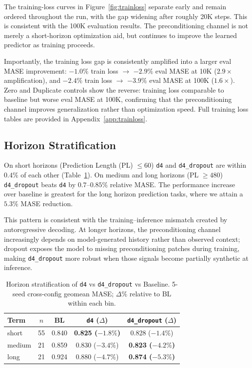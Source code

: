 \documentclass{article}
\begin{document}
The training-loss curves in Figure~\ref{fig:trainloss} separate early and remain ordered throughout the run, with the gap widening after roughly 20K steps. This is consistent with the 100K evaluation results. The preconditioning channel is not merely a short-horizon optimization aid, but continues to improve the learned predictor as training proceeds.

Importantly, the training loss gap is consistently amplified into a larger eval MASE improvement: $-1.0\%$ train loss $\to$ $-2.9\%$ eval MASE at 10K ($2.9\times$ amplification), and $-2.4\%$ train loss $\to$ $-3.9\%$ eval MASE at 100K ($1.6\times$). Zero and Duplicate controls show the reverse: training loss comparable to baseline but worse eval MASE at 100K, confirming that the preconditioning channel improves generalization rather than optimization speed. Full training loss tables are provided in Appendix~\ref{app:trainloss}.

\subsection{Horizon Stratification}

On short horizons (Prediction Length (PL) $\leq 60$) \texttt{d4} and \texttt{d4\_dropout} are within $0.4\%$ of each other (Table~\ref{tab:horizon-main}). On medium and long horizons (PL $\geq 480$) \texttt{d4\_dropout} beats \texttt{d4} by $0.7$--$0.85\%$ relative MASE. The performance increase over baseline is greatest for the long horizon prediction tasks, where we attain a $5.3\%$ MASE reduction.

This pattern is consistent with the training--inference mismatch created by autoregressive decoding. At longer horizons, the preconditioning channel increasingly depends on model-generated history rather than observed context; dropout exposes the model to missing preconditioning patches during training, making \texttt{d4\_dropout} more robust when those signals become partially synthetic at inference.

\begin{table}[t]
\caption{Horizon stratification of \texttt{d4} vs \texttt{d4\_dropout} vs Baseline. 5-seed cross-config geomean MASE; $\Delta\%$ relative to BL within each bin.}
\label{tab:horizon-main}
\vskip 0.06in
\centering
\small
\setlength{\tabcolsep}{3pt}
\begin{tabular}{lcccc}
\toprule
\textbf{Term} & \textbf{$n$} & \textbf{BL} & \texttt{d4} \textbf{($\Delta$)} & \texttt{d4\_dropout} \textbf{($\Delta$)} \\
\midrule
short  & 55 & 0.840 & \textbf{0.825 ($-1.8\%$)} & 0.828 ($-1.4\%$) \\
medium & 21 & 0.859 & 0.830 ($-3.4\%$) & \textbf{0.823 ($-4.2\%$)} \\
long   & 21 & 0.924 & 0.880 ($-4.7\%$) & \textbf{0.874 ($-5.3\%$)} \\
\bottomrule
\end{tabular}
\vskip -0.1in
\end{table}
\end{document}
